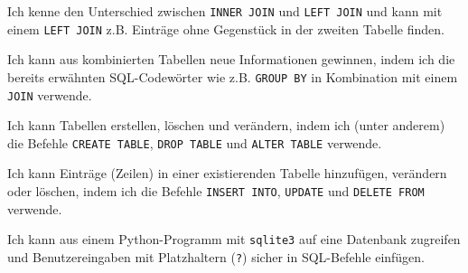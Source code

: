 \begin{todolist}
\item Ich kenne den Unterschied zwischen \lstinline|INNER JOIN| und \lstinline|LEFT JOIN| und kann mit einem \lstinline|LEFT JOIN| z.B. Einträge ohne Gegenstück in der zweiten Tabelle finden.
\item Ich kann aus kombinierten Tabellen neue Informationen gewinnen, indem ich die bereits erwähnten SQL-Codewörter wie z.B. \lstinline|GROUP BY| in Kombination mit einem \lstinline|JOIN| verwende.
\item Ich kann Tabellen erstellen, löschen und verändern, indem ich (unter anderem) die Befehle \lstinline|CREATE TABLE|, \lstinline|DROP TABLE| und \lstinline|ALTER TABLE| verwende.
\item Ich kann Einträge (Zeilen) in einer existierenden Tabelle hinzufügen, verändern oder löschen, indem ich die Befehle \lstinline|INSERT INTO|, \lstinline|UPDATE| und \lstinline|DELETE FROM| verwende.
\item Ich kann aus einem Python-Programm mit \lstinline|sqlite3| auf eine Datenbank zugreifen und Benutzereingaben mit Platzhaltern (\lstinline|?|) sicher in SQL-Befehle einfügen.
\end{todolist}